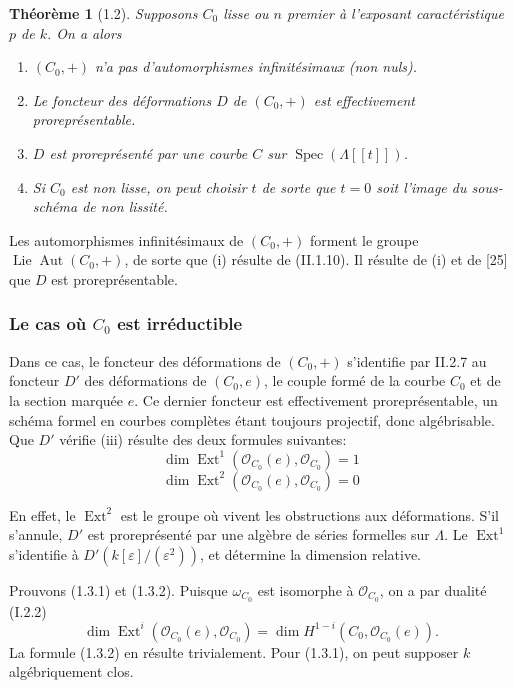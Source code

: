 \documentclass[11pt,a4paper]{amsart}
\theoremstyle{plain}
\newtheorem{theorem}{Th\'eor\`eme}[section]
\theoremstyle{definition}
\DeclareMathOperator{\Aut}{Aut}
\DeclareMathOperator{\Spec}{Spec}
\DeclareMathOperator{\Ext}{Ext}
\DeclareMathOperator{\Lie}{Lie}
\newcommand{\CO}{\mathcal{O}}
\begin{document}
\begin{theorem}[1.2]
Supposons $C_0$ lisse ou $n$ premier \`a l'exposant caract\'eristique $p$ de $k$. On a alors

\begin{enumerate}[label=(\roman*)]
\item $(C_0,+)$ n'a pas d'automorphismes infinit\'esimaux (non nuls).
\item Le foncteur des d\'eformations $D$ de $(C_0,+)$ est effectivement prorepr\'esentable.
\item $D$ est prorepr\'esent\'e par une courbe $C$ sur $\Spec(\Lambda[[t]])$.
\item Si $C_0$ est non lisse, on peut choisir $t$ de sorte que $t=0$ soit l'image du sous-sch\'ema de non lissit\'e.
\end{enumerate}
\end{theorem}

Les automorphismes infinit\'esimaux de $(C_0,+)$ forment le groupe $\Lie \Aut(C_0,+)$, de sorte que (i) r\'esulte de (II.1.10). Il r\'esulte de (i) et de [25] que $D$ est prorepr\'esentable.

\subsubsection{Le cas o\`u $C_0$ est irr\'eductible}

Dans ce cas, le foncteur des d\'eformations de $(C_0,+)$ s'identifie par II.2.7 au foncteur $D'$ des d\'eformations de $(C_0,e)$, le couple form\'e de la courbe $C_0$ et de la section marqu\'ee $e$. Ce dernier foncteur est effectivement prorepr\'esentable, un sch\'ema formel en courbes compl\`etes \'etant toujours projectif, donc alg\'ebrisable. Que $D'$ v\'erifie (iii) r\'esulte des deux formules suivantes:
\begin{equation}\label{eq:1.3.1}
\dim \Ext^1(\CO_{C_0}(e), \CO_{C_0}) = 1
\end{equation}
\begin{equation}\label{eq:1.3.2}
\dim \Ext^2(\CO_{C_0}(e), \CO_{C_0}) = 0
\end{equation}

En effet, le $\Ext^2$ est le groupe o\`u vivent les obstructions aux d\'eformations. S'il s'annule, $D'$ est prorepr\'esent\'e par une alg\`ebre de s\'eries formelles sur $\Lambda$. Le $\Ext^1$ s'identifie \`a $D'(k[\varepsilon]/(\varepsilon^2))$, et d\'etermine la dimension relative.

Prouvons (1.3.1) et (1.3.2). Puisque $\omega_{C_0}$ est isomorphe \`a $\CO_{C_0}$, on a par dualit\'e (I.2.2)
\[
\dim \Ext^i(\CO_{C_0}(e), \CO_{C_0}) = \dim H^{1-i}(C_0, \CO_{C_0}(e)).
\]
La formule (1.3.2) en r\'esulte trivialement. Pour (1.3.1), on peut supposer $k$ alg\'ebriquement clos.
\end{document}
